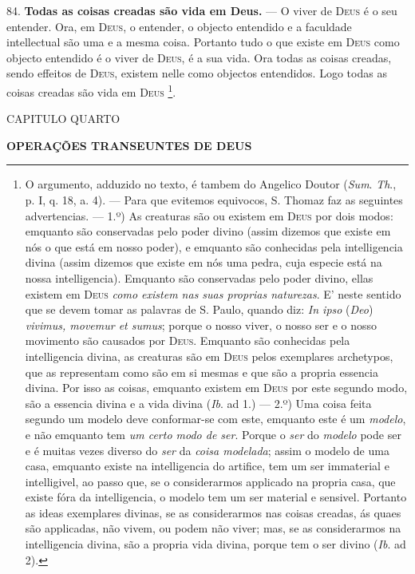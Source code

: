 84. \textbf{Todas as coisas creadas são vida em Deus.} --- O viver de \textsc{Deus} é o seu entender. Ora, em \textsc{Deus}, o entender, o objecto entendido e a faculdade intellectual são uma e a mesma coisa. Portanto tudo o que existe em \textsc{Deus} como objecto entendido é o viver de \textsc{Deus}, é a sua vida. Ora todas as coisas creadas, sendo effeitos de \textsc{Deus}, existem nelle como objectos entendidos. Logo todas as coisas creadas são vida em \textsc{Deus} \footnote{O argumento, adduzido no texto, é tambem do Angelico Doutor (\emph{Sum}. \emph{Th}., p. I, q. 18, a. 4). --- Para que evitemos equivocos, S. Thomaz faz as seguintes advertencias. --- 1.º) As creaturas são ou existem em \textsc{Deus} por dois modos: emquanto são conservadas pelo poder divino (assim dizemos que existe em nós o que está em nosso poder), e emquanto são conhecidas pela intelligencia divina (assim dizemos que existe em nós uma pedra, cuja especie está na nossa intelligencia). Emquanto são conservadas pelo poder divino, ellas existem em \textsc{Deus} \emph{como existem nas suas proprias naturezas}. E' neste sentido que se devem tomar as palavras de S. Paulo, quando diz: \emph{In ipso} (\emph{Deo}) \emph{vivimus, movemur et sumus}; porque o nosso viver, o nosso ser e o nosso movimento são causados por \textsc{Deus}. Emquanto são conhecidas pela intelligencia divina, as creaturas são em \textsc{Deus} pelos exemplares archetypos, que as representam como são em si mesmas e que são a propria essencia divina. Por isso as coisas, emquanto existem em \textsc{Deus} por este segundo modo, são a essencia divina e a vida divina (\emph{Ib}. ad 1.) --- 2.º) Uma coisa feita segundo um modelo deve conformar-se com este, emquanto este é um \emph{modelo}, e não emquanto tem \emph{um certo modo de ser}. Porque o \emph{ser} do \emph{modelo} pode ser e é muitas vezes diverso do \emph{ser} da \emph{coisa modelada}; assim o modelo de uma casa, emquanto existe na intelligencia do artifice, tem um ser immaterial e intelligivel, ao passo que, se o considerarmos applicado na propria casa, que existe fóra da intelligencia, o modelo tem um ser material e sensivel. Portanto as ideas exemplares divinas, se as considerarmos nas coisas creadas, ás quaes são applicadas, não vivem, ou podem não viver; mas, se as considerarmos na intelligencia divina, são a propria vida divina, porque tem o ser divino (\emph{Ib}. ad 2).}.

 CAPITULO QUARTO

\textbf{OPERAÇÕES TRANSEUNTES DE DEUS}

